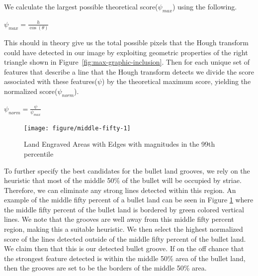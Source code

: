 \documentclass[12pt]{article}\usepackage[]{graphicx}\usepackage[]{color}
\newenvironment{knitrout}{}{} %
\theoremstyle{nonumberplain}
\begin{document}
We calculate the largest possible theoretical score($\psi_{max}$) using the following.
\begin{center}
  $\psi_{max} = \frac{h}{\cos(\theta)}$
\end{center}
This should in theory give us the total possible pixels that the Hough transform could have detected in our image by exploiting geometric properties of the right triangle shown in Figure~\ref{fig:max-graphic-inclusion}. Then for each unique set of features that describe a line that the Hough transform detects we divide the score associated with these features($\psi$) by the theoretical maximum score, yielding the normalized score($\psi_{norm}$).
\begin{center}
 $\psi_{norm} = \frac{\psi}{\psi_{max}}$
\end{center}

\begin{knitrout}
\color{fgcolor}\begin{figure}[H]

{\centering \texttt{[image: figure/middle-fifty-1]} 

}

\caption[Land Engraved Areas with Edges with magnitudes in the 99th percentile]{Land Engraved Areas with Edges with magnitudes in the 99th percentile}\label{fig:middle-fifty}
\end{figure}


\end{knitrout}


To further specify the best candidates for the bullet land grooves, we rely on the heuristic that most of the middle 50\% of the bullet will be occupied by striae. Therefore, we can eliminate any strong lines detected within this region. An example of the middle fifty percent of a bullet land can be seen in Figure \ref{fig:middle-fifty} where the middle fifty percent of the bullet land is bordered by green colored vertical lines. We note that the grooves are well away from this middle fifty percent region, making this a suitable heuristic. We then select the highest normalized score of the lines detected outside of the middle fifty percent of the bullet land. We claim then that this is our detected bullet groove. If on the off chance that the strongest feature detected is within the middle 50\% area of the bullet land, then the grooves are set to be the borders of the middle 50\% area. 
\end{document}
